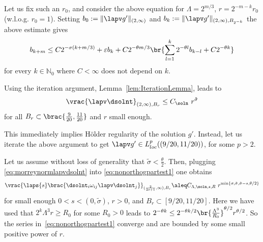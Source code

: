 Let us fix such an $r_0$, and consider the above equation for $\Lambda = 2^{m/3}$,
$r = 2^{-m-k} r_0$ (w.l.o.g. $r_0 = 1$).  Setting $b_0 := \|\lapv   g'\|_{(2,\infty)}$ 
and $b_k:= \|\lapv  g'\|_{(2,\infty),B_{2^{-k}}}$ the above estimate gives
\begin{equation*}
 b_{k+m} \leq C 2^{-\sigma (k+m/3)} + \varepsilon b_{k} + 
 C 2^{-\theta m/3}\br{\sum_{l=1}^{k} 2^{-\theta l}b_{k-l}
 +C2^{-\theta k}}
\end{equation*}
for every $k \in \mathbb N_0$ where $C< \infty$ does not depend on $k$.

Using the iteration argument, Lemma~\ref{lem:IterationLemma}, leads to
\begin{equation} \label{eq:morreynormlapvdsolnt}
 \vrac{\lapv \dsolnt}_{(2,\infty),B_r} \leq C_{\soln}\ r^{\tilde{\sigma}}
\end{equation}
for all $B_{r} \subset \brac{\frac{9}{20},\frac{11}{20}}$
 and $r$ small enough.


This immediately implies H\"older regularity of the solution $g'$. Instead, let us iterate
the above argument to get $\lapv g' \in L^p_{loc}((9/20,11/20))$, for some $p > 2$.

Let us assume without loss of generality that $\tilde{\sigma} < \frac{\theta}{2}$. 
Then, plugging \eqref{eq:morreynormlapvdsolnt} into \eqref{eq:nonorthogpartest1} one obtains
\[
 \vrac{\laps{s}\brac{\dsolnt_i \omega_{ij} \lapv \dsolnt_j}}_{(\frac{2}{2s+1},\infty),B_{r}} 
 \aleq C_{\Lambda,\soln,s,R}\ r^{\min\{\sigma,\tilde{\sigma}, \tilde{\sigma}-s,\theta/2\}}
\]
for small enough $0<s<(0,\tilde\sigma)$, $r>0$, and $B_r \subset [9/20, 11/20]$.
Here we have used that
$2^{k}\Lambda^{3}r\ge R_{0}$ for some $R_{0}>0$ leads
to $2^{-\theta k}\le 2^{-\theta k/2}\br{\frac{\Lambda^{3}}{R_{0}}}^{\theta/2}r^{\theta/2}$.
So the series in~\eqref{eq:nonorthogpartest1}
converge and are bounded by some small positive power of $r$.


